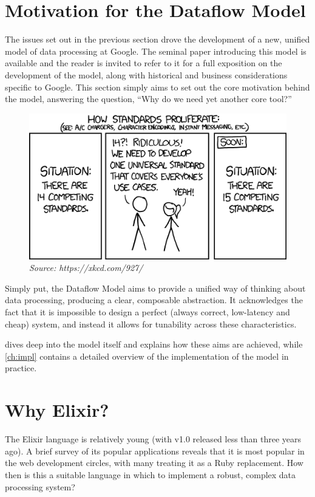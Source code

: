 \section{Motivation for the Dataflow Model}\label{sec:intro:motivation}

The issues set out in the previous section drove the development of a new, unified model of data processing at Google.
The seminal paper introducing this model is available \cite{Akidau:2015} and the reader is invited to refer to it for a full exposition on the development of the model, along with historical and business considerations specific to Google.
This section simply aims to set out the core motivation behind the model, answering the question, ``Why do we need yet another core tool?''

\begin{figure}[h]
	\centering
	\includegraphics[width=.75\textwidth]{images/xkcd-standards}
	\caption*{\textit{Source: https://xkcd.com/927/}}
\end{figure}

Simply put, the Dataflow Model aims to provide a unified way of thinking about data processing, producing a clear, composable abstraction.
It acknowledges the fact that it is impossible to design a perfect (always correct, low-latency and cheap) system, and instead it allows for tunability across these characteristics.

 dives deep into the model itself and explains how these aims are achieved, while \cref{ch:impl} contains a detailed overview of the implementation of the model in practice.

\section{Why Elixir?}\label{sec:intro:elixir}

The Elixir language \cite{Elixir} is relatively young (with v1.0 released less than three years ago).
A brief survey of its popular applications reveals that it is most popular in the web development circles, with many treating it as a Ruby replacement.
How then is this a suitable language in which to implement a robust, complex data processing system?

